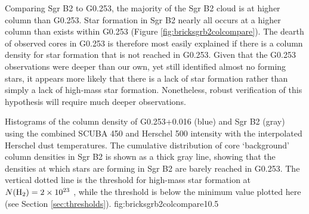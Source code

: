 \documentclass[twocolumn]{aastex61}
\begin{document}
Comparing Sgr B2 to G0.253, the majority of the Sgr B2 cloud is at higher
column than G0.253.  Star formation in Sgr B2 nearly all occurs
at a higher column than exists within G0.253 (Figure
\ref{fig:bricksgrb2colcompare}).  The dearth of observed cores in G0.253 is
therefore most easily explained if there is a column density for star
formation that is not reached in G0.253.  Given that the G0.253 observations
were deeper than our own, yet still identified almost no forming stars, it
appears more likely that there is a lack of star formation rather than simply a
lack of high-mass star formation.  Nonetheless, robust verification of this
hypothesis will require much deeper observations.

{Histograms of the column density of G0.253+0.016 (blue) and Sgr B2 (gray)
using the combined SCUBA 450 \um and Herschel 500 \um intensity with the
interpolated Herschel dust temperatures.  The cumulative distribution of core
`background' column densities in Sgr B2 is shown as a thick gray line, showing
that the densities at which stars are forming in Sgr B2 are barely
reached in G0.253.  The vertical dotted line is the \citet{Krumholz2008a}
threshold for high-mass star formation at $N(\textrm{H}_{2})=2\times10^{23}$ \persc, while
the \citet{Lada2010a} threshold is below the minimum value plotted here (see
Section \ref{sec:thresholds}).}
{fig:bricksgrb2colcompare}{1}{0.5\textwidth}

% 
% 
\end{document}
